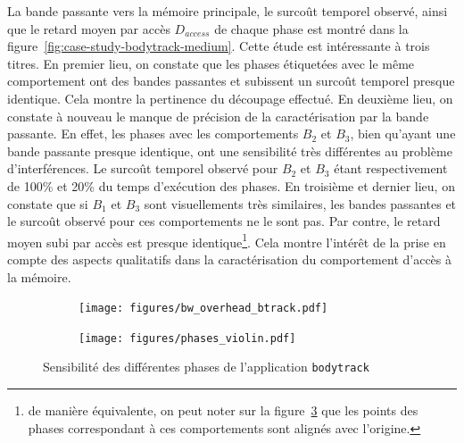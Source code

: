La bande passante vers la mémoire principale, le surcoût temporel observé, ainsi que le retard moyen par accès $D_{access}$ de chaque phase est montré dans la figure~\ref{fig:case-study-bodytrack-medium}.
Cette étude est intéressante à trois titres.
En premier lieu, on constate que les phases étiquetées avec le même comportement ont des bandes passantes et subissent un surcoût temporel presque identique.
Cela montre la pertinence du découpage effectué.
En deuxième lieu, on constate à nouveau le manque de précision de la caractérisation par la bande passante.
En effet, les phases avec les comportements $B_2$ et $B_3$, bien qu'ayant une bande passante presque identique, ont une sensibilité très différentes au problème d'interférences.
Le surcoût temporel observé pour $B_2$ et $B_3$ étant respectivement de 100\% et 20\% du temps d'exécution des phases. 
En troisième et dernier lieu, on constate que si $B_1$ et $B_3$ sont visuellements très similaires, les bandes passantes et le surcoût observé pour ces comportements ne le sont pas.
Par contre, le retard moyen subi par accès est presque identique\footnote{de manière équivalente, on peut noter sur la figure~\ref{fig:case_study} que les points des phases correspondant à ces comportements sont alignés avec l'origine.}.
Cela montre l'intérêt de la prise en compte des aspects qualitatifs dans la caractérisation du comportement d'accès à la mémoire.


\begin{figure}[ht!]
  \begin{subfigure}[t]{0.68\linewidth}
    \texttt{[image: figures/bw\_overhead\_btrack.pdf]}
    \caption{\label{fig:bw_ovd_btrack}}
  \end{subfigure}
  \begin{subfigure}[t]{0.3\linewidth}
    \texttt{[image: figures/phases\_violin.pdf]}
    \caption{\label{fig:phases_violin}}
  \end{subfigure}
	\caption{\label{fig:case_study} Sensibilité des différentes phases de l'application \texttt{bodytrack}}
\end{figure}


